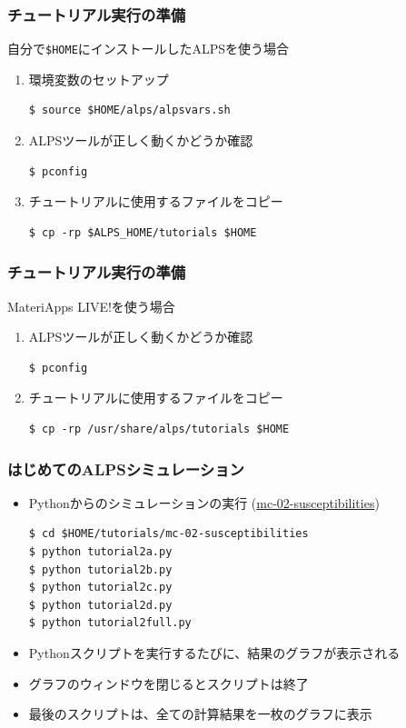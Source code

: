 \begin{frame}[t,fragile]
  \frametitle{チュートリアル実行の準備}
  自分で\verb+$HOME+にインストールしたALPSを使う場合
  \begin{enumerate}
  \item 環境変数のセットアップ
\begin{lstlisting}
$ source $HOME/alps/alpsvars.sh
\end{lstlisting}
  \item ALPSツールが正しく動くかどうか確認
\begin{lstlisting}
$ pconfig
\end{lstlisting}
  \item チュートリアルに使用するファイルをコピー
\begin{lstlisting}
$ cp -rp $ALPS_HOME/tutorials $HOME
\end{lstlisting}
  \end{enumerate}
\end{frame}

\begin{frame}[t,fragile]
  \frametitle{チュートリアル実行の準備}
  MateriApps LIVE!を使う場合
  \begin{enumerate}
  \item ALPSツールが正しく動くかどうか確認
\begin{lstlisting}
$ pconfig
\end{lstlisting}
  \item チュートリアルに使用するファイルをコピー
\begin{lstlisting}
$ cp -rp /usr/share/alps/tutorials $HOME
\end{lstlisting}
  \end{enumerate}
\end{frame}

\begin{frame}[t,fragile]
  \frametitle{はじめてのALPSシミュレーション}
  \begin{itemize}
    \item Pythonからのシミュレーションの実行 (\href{http://alps.comp-phys.org/mediawiki/index.php/ALPS_2_Tutorials:MC-02_Susceptibilities}{mc-02-susceptibilities})
\begin{lstlisting}
$ cd $HOME/tutorials/mc-02-susceptibilities
$ python tutorial2a.py
$ python tutorial2b.py
$ python tutorial2c.py
$ python tutorial2d.py
$ python tutorial2full.py
\end{lstlisting}
    \item Pythonスクリプトを実行するたびに、結果のグラフが表示される
    \item グラフのウィンドウを閉じるとスクリプトは終了
    \item 最後のスクリプトは、全ての計算結果を一枚のグラフに表示
  \end{itemize}
\end{frame}


